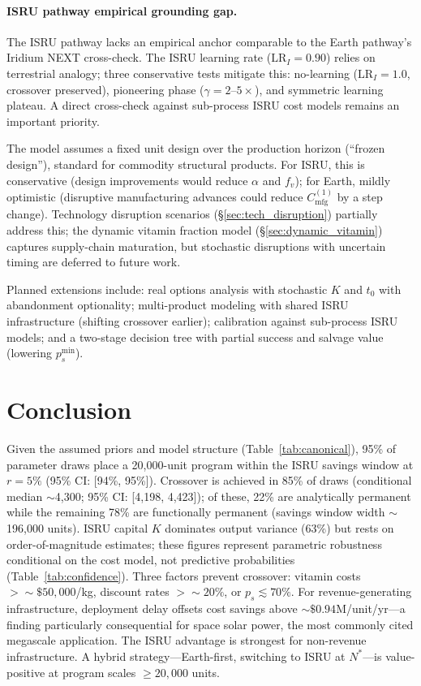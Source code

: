 \documentclass[preprint,12pt]{elsarticle}
\begin{document}
\paragraph{ISRU pathway empirical grounding gap.} The ISRU pathway lacks an empirical anchor comparable to the Earth pathway's Iridium NEXT cross-check. The ISRU learning rate ($\mathrm{LR}_I = 0.90$) relies on terrestrial analogy; three conservative tests mitigate this: no-learning ($\mathrm{LR}_I = 1.0$, crossover preserved), pioneering phase ($\gamma = 2$--$5\times$), and symmetric learning plateau. A direct cross-check against sub-process ISRU cost models remains an important priority.

The model assumes a fixed unit design over the production horizon (``frozen design''), standard for commodity structural products. For ISRU, this is conservative (design improvements would reduce $\alpha$ and $f_v$); for Earth, mildly optimistic (disruptive manufacturing advances could reduce $C_{\mathrm{mfg}}^{(1)}$ by a step change). Technology disruption scenarios (\S\ref{sec:tech_disruption}) partially address this; the dynamic vitamin fraction model (\S\ref{sec:dynamic_vitamin}) captures supply-chain maturation, but stochastic disruptions with uncertain timing are deferred to future work.

Planned extensions include: real options analysis with stochastic $K$ and $t_0$ with abandonment optionality; multi-product modeling with shared ISRU infrastructure (shifting crossover earlier); calibration against sub-process ISRU models; and a two-stage decision tree with partial success and salvage value (lowering $p_s^{\min}$).

\section{Conclusion}
\label{sec:conclusion}

Given the assumed priors and model structure (Table~\ref{tab:canonical}), 95\% of parameter draws place a 20{,}000-unit program within the ISRU savings window at $r = 5\%$ (95\% CI: [94\%, 95\%]). Crossover is achieved in 85\% of draws (conditional median ${\sim}$4{,}300; 95\% CI: [4{,}198, 4{,}423]); of these, 22\% are analytically permanent while the remaining 78\% are functionally permanent (savings window width ${\sim}$196{,}000 units). ISRU capital $K$ dominates output variance (63\%) but rests on order-of-magnitude estimates; these figures represent parametric robustness conditional on the cost model, not predictive probabilities (Table~\ref{tab:confidence}). Three factors prevent crossover: vitamin costs $> {\sim}\$50{,}000$/kg, discount rates $> {\sim}20\%$, or $p_s \lesssim 70\%$. For revenue-generating infrastructure, deployment delay offsets cost savings above ${\sim}\$0.94$M/unit/yr---a finding particularly consequential for space solar power, the most commonly cited megascale application. The ISRU advantage is strongest for non-revenue infrastructure. A hybrid strategy---Earth-first, switching to ISRU at $N^*$---is value-positive at program scales $\geq 20{,}000$ units.
\end{document}
